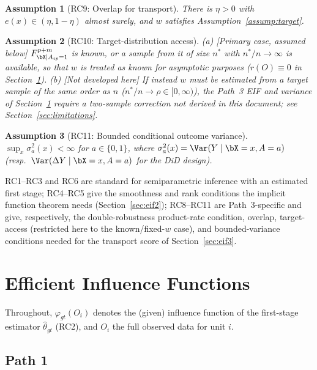 \documentclass{article}
\newtheorem{assumption}{Assumption}
\begin{document}
\begin{assumption}[RC9: Overlap for transport]\label{RC9}
There is $\eta>0$ with $e(x) \in (\eta,1-\eta)$ almost surely, and $w$ satisfies Assumption~\ref{assump:target}.
\end{assumption}
\begin{assumption}[RC10: Target-distribution access]\label{RC10}
(a) [\emph{Primary case, assumed below}] $F^{p+m}_{\bX\mid A_{ip}=1}$ is known, or a sample from it of size $n^*$ with $n^*/n\to\infty$ is available, so that $w$ is treated as known for asymptotic purposes ($r(O)\equiv0$ in Section~\ref{sec:eif}). (b) [\emph{Not developed here}] If instead $w$ must be estimated from a target sample of the same order as $n$ ($n^*/n\to\rho\in[0,\infty)$), the Path~3 EIF and variance of Section~\ref{sec:eif} require a two-sample correction not derived in this document; see Section~\ref{sec:limitations}.
\end{assumption}
\begin{assumption}[RC11: Bounded conditional outcome variance]\label{RC11}
$\sup_x \sigma_a^2(x) < \infty$ for $a\in\{0,1\}$, where $\sigma_a^2(x) = \Var(Y\mid \bX=x, A=a)$ (resp.\ $\Var(\Delta Y\mid \bX=x,A=a)$ for the DiD design).
\end{assumption}

\begin{remark}
RC1--RC3 and RC6 are standard for semiparametric inference with an estimated first stage; RC4--RC5 give the smoothness and rank conditions the implicit function theorem needs (Section~\ref{sec:eif2}); RC8--RC11 are Path~3-specific and give, respectively, the double-robustness product-rate condition, overlap, target-access (restricted here to the known/fixed-$w$ case), and bounded-variance conditions needed for the transport score of Section~\ref{sec:eif3}.
\end{remark}

\section{Efficient Influence Functions}
\label{sec:eif}

Throughout, $\varphi_{gt}(O_i)$ denotes the (given) influence function of the first-stage estimator $\widehat\theta_{gt}$ (RC2), and $O_i$ the full observed data for unit $i$.

\subsection{Path 1}
\label{sec:eif1}
\end{document}
